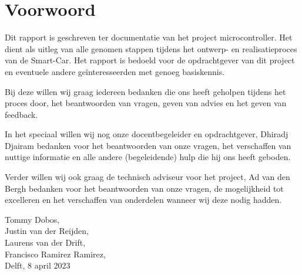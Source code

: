 \section*{Voorwoord}
Dit rapport is geschreven ter documentatie van het project microcontroller. Het dient als uitleg van alle genomen stappen tijdens het ontwerp- en realisatieproces van de \gls{Smart-Car}.  Het rapport is bedoeld voor de opdrachtgever van dit project en eventuele andere geïnteresseerden met genoeg basiskennis. 

Bij deze willen wij graag iedereen bedanken die ons heeft geholpen tijdens het proces door, het beantwoorden van vragen, geven van advies en het geven van feedback. 

In het speciaal willen wij nog onze docentbegeleider en opdrachtgever, Dhiradj Djairam bedanken voor het beantwoorden van onze vragen, het verschaffen van nuttige informatie en alle andere (begeleidende) hulp die hij ons heeft geboden. 

Verder willen wij ook graag de technisch adviseur voor het project, Ad van den Bergh bedanken voor het beantwoorden van onze vragen, de mogelijkheid tot excelleren en het verschaffen van onderdelen wanneer wij deze nodig hadden. 


Tommy Dobos,
\\
Justin van der Reijden,
\\
Laurens van der Drift,
\\
Francisco Ramirez Ramirez,
\\
Delft, 8 april 2023